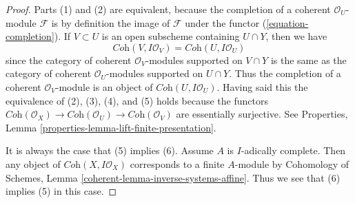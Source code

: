 \documentclass{stacks-project}
\theoremstyle{plain}
\theoremstyle{definition}
\theoremstyle{remark}
\numberwithin{equation}{subsection}
\begin{document}
\begin{proof}
Parts (1) and (2) are equivalent, because the completion of a coherent
$\mathcal{O}_U$-module $\mathcal{F}$ is by definition the image of
$\mathcal{F}$ under the functor (\ref{equation-completion}).
If $V \subset U$ is an open subscheme containing $U \cap Y$, then we have
$$
\textit{Coh}(V, I\mathcal{O}_V) =
\textit{Coh}(U, I\mathcal{O}_U)
$$
since the category of coherent $\mathcal{O}_V$-modules supported on
$V \cap Y$ is the same as the category of coherent $\mathcal{O}_U$-modules
supported on $U \cap Y$. Thus the completion of a coherent
$\mathcal{O}_V$-module is an object of $\textit{Coh}(U, I\mathcal{O}_U)$.
Having said this the equivalence of (2), (3), (4), and (5)
holds because the functors
$\textit{Coh}(\mathcal{O}_X) \to \textit{Coh}(\mathcal{O}_U) \to
\textit{Coh}(\mathcal{O}_V)$ are essentially surjective.
See Properties, Lemma \ref{properties-lemma-lift-finite-presentation}.

\medskip\noindent
It is always the case that (5) implies (6). Assume $A$ is $I$-adically complete.
Then any object of $\textit{Coh}(X, I\mathcal{O}_X)$ corresponds to a finite
$A$-module by Cohomology of Schemes, Lemma
\ref{coherent-lemma-inverse-systems-affine}.
Thus we see that (6) implies (5) in this case.
\end{proof}
\end{document}
